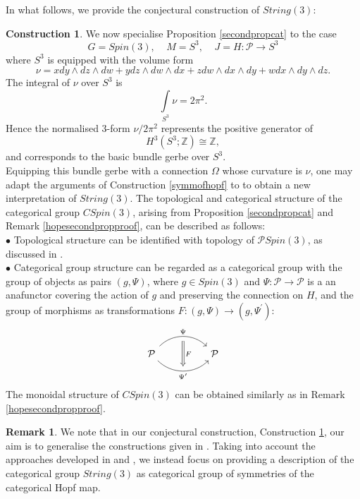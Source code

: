 \documentclass{article}
\theoremstyle{plain}
\theoremstyle{definition}
\newtheorem{rem}[thm]{Remark}
\newtheorem{const}[thm]{Construction}
\begin{document}
In what follows, we provide the conjectural construction of $String(3)$:
\begin{const}\label{catextensionofspin}
We now specialise Proposition \ref{secondpropcat} to the case $$G = Spin(3), ~~~~~ M = S^3, ~~~~~ J = H:\mathcal{P} \longrightarrow S^3$$
where $S^3$ is equipped with the volume form
\[
\nu=xdy \wedge dz \wedge dw + ydz \wedge dw \wedge dx + zdw \wedge dx \wedge dy + wdx \wedge dy \wedge dz.
\]
The integral of $\nu$ over $S^3$ is
\[
\int\limits_{S^3} \nu = 2\pi^2.
\]
Hence the normalised $3$-form $\nu/2\pi^2$ represents the positive generator of $$H^3(S^3;\mathbb{Z}) \cong \mathbb{Z},$$
and corresponds to the basic bundle gerbe over $S^3$. \\
Equipping this bundle gerbe with a connection $\Omega$ whose curvature is $\nu$, one may adapt the arguments of Construction \ref{symmofhopf} to to obtain a new interpretation of $String(3)$. The topological and categorical structure of the categorical group $CSpin(3)$, arising from Proposition \ref{secondpropcat} and Remark \ref{hopesecondpropproof}, can be described as follows: \\
$\bullet$ Topological structure can be identified with topology of $\mathcal{P}Spin(3)$, as discussed in \cite{MR2366945}. \\
$\bullet$ Categorical group structure can be regarded as a categorical group with the group of objects as pairs $(g,\Psi)$, where $g \in Spin(3)$ and $\Psi:\mathcal{P} \longrightarrow \mathcal{P}$ is a an anafunctor covering the action of $g$ and preserving the connection on $H$, and the group of morphisms as transformations $F:(g,\Psi) \longrightarrow (g,\Psi^\prime)$:
\[
\begin{tikzcd}
\mathcal{P} \arrow[rr,bend left=45,"{\Psi}",""{name=u1,below}] \arrow[rr,bend right=45,"{\Psi^\prime}"',""{name=u2,above}] \arrow[Rightarrow,from=u1,to=u2,"F"] & & \mathcal{P}
\end{tikzcd}
\]
The monoidal structure of $CSpin(3)$ can be obtained similarly as in Remark \ref{hopesecondpropproof}.
\end{const}
\begin{rem}
We note that in our conjectural construction, Construction \ref{catextensionofspin}, our aim is to generalise the constructions given in \cite{MR900587}. Taking into account the approaches developed in \cite{MR3535115} and \cite{MR4268834}, we instead focus on providing a description of the categorical group $String(3)$ as categorical group of symmetries of the categorical Hopf map.
\end{rem}
\end{document}
